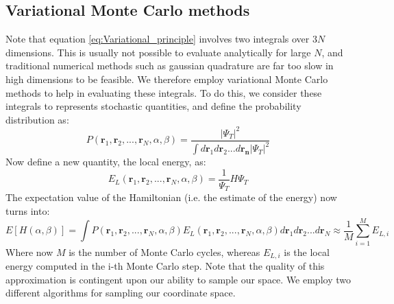 \documentclass[a4paper, 10pt]{article}
\begin{document}
	\subsection{Variational Monte Carlo methods}
	Note that equation \ref{eq:Variational_principle} involves two integrals over $3N$ dimensions. This is usually not possible to evaluate analytically for large $N$, and traditional numerical methods such as gaussian quadrature are far too slow in high dimensions to be feasible. We therefore employ variational Monte Carlo methods to help in evaluating these integrals. To do this, we consider these integrals to represents stochastic quantities, and define the probability distribution as:
	\begin{equation}
	P(\boldsymbol{r}_1, \boldsymbol{r}_2,...,\boldsymbol{r}_N, \alpha,\beta)=\frac{|\Psi_T|^2}{\int d\boldsymbol{r}_1d\boldsymbol{r}_2...d\boldsymbol{r_n}|\Psi_T|^2}
	\end{equation}
	Now define a new quantity, the local energy, as:
	\begin{equation}\label{eq:Local_energy_general_expression}
	E_L(\boldsymbol{r}_1, \boldsymbol{r}_2,...,\boldsymbol{r}_N, \alpha,\beta)=\frac{1}{\Psi_T}H\Psi_T
	\end{equation}
	The	expectation value of the Hamiltonian (i.e. the estimate of the energy) now turns into:
	\begin{equation}\label{eq:Expectation_Hamiltonian}
	E[H(\alpha, \beta)]=\int P(\boldsymbol{r}_1, \boldsymbol{r}_2,...,\boldsymbol{r}_N, \alpha,\beta)E_L(\boldsymbol{r}_1, \boldsymbol{r}_2,...,\boldsymbol{r}_N, \alpha,\beta)d\boldsymbol{r}_1d\boldsymbol{r}_2...d\boldsymbol{r}_N\approx \frac{1}{M}\sum_{i=1}^M E_{L,i}
	\end{equation}
	Where now $M$ is the number of Monte Carlo cycles, whereas $E_{L,i}$ is the local energy computed in the i-th Monte Carlo step. Note that the quality of this approximation is contingent upon our ability to sample our space. We employ two different algorithms for sampling our coordinate space.
\end{document}
